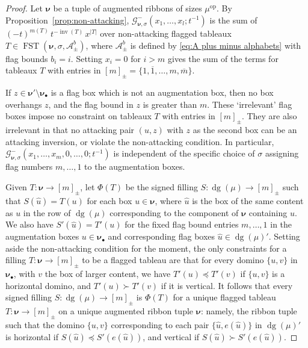 \documentclass[12pt]{amsart}
\theoremstyle{definition}
\theoremstyle{remark}
\newcommand{\nubold}{{\boldsymbol \nu }}
\newcommand{\Acal}{{\mathcal A}}
\newcommand{\Gcal}{{\mathcal G}}
\newcommand{\uhat}{\widehat{u}}
\newcommand{\sgngt}{\succ}
\newcommand{\sgnle}{\preccurlyeq}
\newcommand{\baug}{\bullet }
\DeclareMathOperator{\dg}{dg}
\DeclareMathOperator{\inv}{inv}
\DeclareMathOperator{\FSST}{FST}
\DeclareMathOperator{\op}{op}
\begin{document}
\begin{proof}
Let $\nubold $ be a tuple of augmented ribbons of sizes $\mu ^{\op }$.
By Proposition~\ref{prop:non-attacking}, $\Gcal _{\nubold ,\sigma
}^{-}(x_{1},\ldots,x_{l};t^{-1})$ is the sum of $(-t)^{m(T)}\,
t^{-\inv (T)}\, x^{|T|}$ over non-attacking flagged tableaux $T \in
\FSST (\nubold ,\sigma ,\Acal ^{b}_{\pm })$, where $\Acal ^{b}_{\pm }$
is defined by \eqref{eq:A plus minus alphabets} with flag bounds
$b_{i} = i$.  Setting $x_{i} = 0$ for $i>m$ gives the sum of the terms
for tableaux $T$ with entries in $[m]_{\pm } =
\{1,\overline{1},\ldots,m,\overline{m} \}$.

If $z\in \nubold ' \setminus \nubold _{\baug }$ is a flag box which
is not an augmentation box, then no box overhangs $z$, and the flag
bound in $z$ is greater than $m$.  These `irrelevant' flag boxes
impose no constraint on tableaux $T$ with entries in $[m]_{\pm }$.
They are also irrelevant in that no attacking pair $(u,z)$ with $z$ as
the second box can be an attacking inversion, or violate the
non-attacking condition.  In particular, $\Gcal _{\nubold ,\sigma
}^{-} (x_{1}, \ldots, x_{m}, 0,\ldots, 0;t^{-1})$ is independent of
the specific choice of $\sigma $ assigning flag numbers $m,\ldots,1$
to the augmentation boxes.

Given $T\colon \nubold \rightarrow [m]_{\pm }$, let $\Phi (T)$ be the
signed filling $S\colon \dg (\mu )\rightarrow [m]_{\pm }$ such that
$S(\uhat ) = T(u)$ for each box $u\in \nubold $, where $\uhat $ is the
box of the same content as $u$ in the row of $\dg (\mu )$
corresponding to the component of $\nubold $ containing $u$.  We also
have $S'(\uhat ) = T'(u)$ for the fixed flag bound entries
$m,\ldots,1$ in the augmentation boxes $u\in \nubold _{\baug }$ and
corresponding flag boxes $\uhat \in \dg (\mu )'$.  Setting aside the
non-attacking condition for the moment, the only constraints for a
filling $T\colon \nubold \rightarrow [m]_{\pm }$ to be a flagged
tableau are that for every domino $\{u, v\}$ in $\nubold _{\baug }$,
with $v$ the box of larger content, we have $T'(u) \sgnle T'(v)$ if
$\{u, v\}$ is a horizontal domino, and $T'(u) \sgngt T'(v)$ if it is
vertical.  It follows that every signed filling $S\colon \dg (\mu
)\rightarrow [m]_{\pm }$ is $\Phi (T)$ for a unique flagged tableau
$T\colon \nubold \rightarrow [m]_{\pm }$ on a unique augmented ribbon
tuple $\nubold $: namely, the ribbon tuple such that the domino $\{u,v
\}$ corresponding to each pair $\{\uhat , e(\uhat )\}$ in $\dg (\mu
)'$ is horizontal if $S(\uhat )\sgnle S'(e(\uhat ))$, and vertical if
$S(\uhat )\sgngt S'(e(\uhat ))$.


\end{proof}
\end{document}
